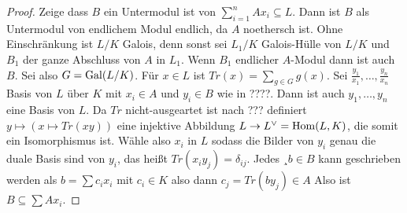 \begin{proof}
	Zeige dass \(B\) ein Untermodul ist von \(\sum_{i=1}^{n}Ax_i\subseteq L\). Dann ist \(B\) als Untermodul von endlichem Modul
	endlich, da \(A\) noethersch ist.
	Ohne Einschränkung ist \(L/K\) Galois, denn sonst sei \(L_1/K\) Galois-Hülle von \(L/K\) und \(B_1\) der
	ganze Abschluss von \(A\) in \(L_1\). Wenn \(B_1\) endlicher \(A\)-Modul dann ist auch \(B\).
	Sei also \(G=\operatorname{Gal}(L/K)\).
	Für \(x\in L\) ist \(Tr(x)=\sum_{g\in G}g(x)\).
	Sei \(\frac{y_1}{x_1},\dots,\frac{y_n}{x_n}\) Basis von \(L\) über \(K\) mit \(x_i\in A\) und \(y_i\in B\) wie
	in ????.
	Dann ist auch \(y_1,\dots,y_n\) eine Basis von \(L\).
	Da \(Tr\) nicht-ausgeartet ist nach ??? definiert \(y\mapsto (x\mapsto Tr(xy))\) eine injektive Abbildung 
	\(L\to L^\vee=\operatorname{Hom}(L,K)\), die somit ein Isomorphismus ist. Wähle also \(x_i\) in \(L\) sodass die Bilder von \(y_i\) genau die 
	duale Basis sind von \(y_i\), das heißt \(Tr(x_iy_j)=\delta_{ij}\).
	Jedes ¸\(b\in B\) kann geschrieben werden als 
	\(b=\sum c_ix_i\) mit \(c_i\in K\) also dann \(c_j=Tr(by_j)\in A\)
	Also ist \(B\subseteq \sum Ax_i\).
	
\end{proof}
